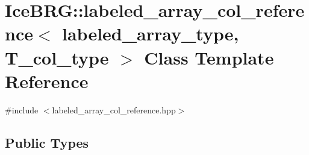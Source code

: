 \hypertarget{classIceBRG_1_1labeled__array__col__reference}{}\section{Ice\+B\+R\+G\+:\+:labeled\+\_\+array\+\_\+col\+\_\+reference$<$ labeled\+\_\+array\+\_\+type, T\+\_\+col\+\_\+type $>$ Class Template Reference}
\label{classIceBRG_1_1labeled__array__col__reference}


{\ttfamily \#include $<$labeled\+\_\+array\+\_\+col\+\_\+reference.\+hpp$>$}

\subsection*{Public Types}
